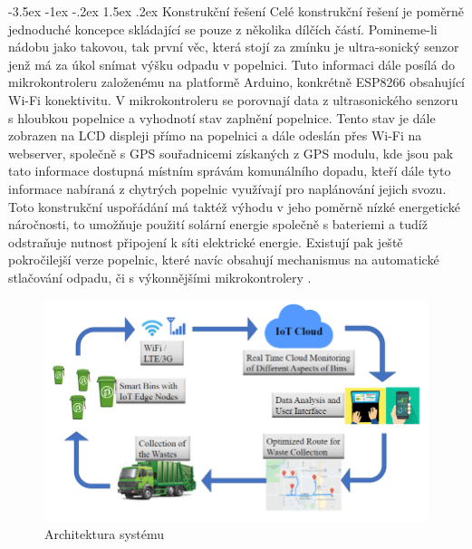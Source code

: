 \documentclass[a4paper,10pt]{article}
\makeatletter
\theoremstyle{definition}
\renewcommand\subsection{\@startsection {subsection}{1}{\z@}%
                                   {-3.5ex \@plus -1ex \@minus -.2ex}%
                                   {1.5ex \@plus.2ex}%
                                   {\normalsize\bfseries}}
\makeatother
\begin{document}
\subsection{Konstrukční řešení}
\label{subsec:1}
Celé konstrukční řešení je poměrně jednoduché koncepce skládající se pouze z několika dílčích částí. Pomineme-li nádobu jako  takovou, tak první věc, která stojí za zmínku je ultra-sonický senzor jenž má za úkol snímat výšku odpadu v popelnici. Tuto informaci dále posílá do mikrokontroleru založenému na platformě Arduino, konkrétně ESP8266 obsahující Wi-Fi konektivitu. V mikrokontroleru se porovnají data z ultrasonického senzoru s hloubkou popelnice a vyhodnotí stav zaplnění popelnice. Tento stav je dále zobrazen na LCD displeji přímo na popelnici a dále odeslán přes Wi-Fi na webserver, společně s GPS souřadnicemi získaných z GPS modulu, kde jsou pak tato informace dostupná místním správám komunálního dopadu, kteří dále tyto informace nabíraná z chytrých popelnic využívají pro naplánování jejich svozu. Toto konstrukční uspořádání má taktéž výhodu v jeho poměrně nízké energetické náročnosti, to umožňuje použití solární energie společně s bateriemi a tudíž odstraňuje nutnost připojení k síti elektrické energie. Existují pak ještě pokročilejší verze popelnic, které navíc obsahují mechanismus na automatické stlačování odpadu, či s výkonnějšími mikrokontrolery \cite{inproceedings}\cite{9418359}\cite{Chaware2017SmartGM}.

\begin{figure}[H]
\begin{center}
\includegraphics[scale=0.4]{Images/Smart bins.jpg}
\caption{Architektura systému \cite{inproceedings}}
\label{fig:1}
\end{center}
\end{figure}
\end{document}

